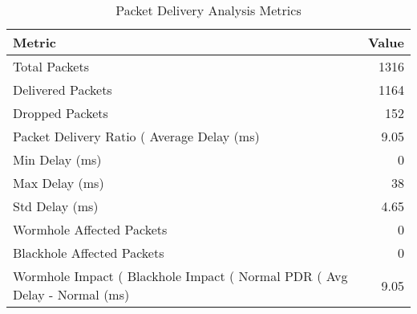 \begin{table}[htbp]
\centering
\caption{Packet Delivery Analysis Metrics}
\begin{tabular}{|l|r|}
\hline
\textbf{Metric} & \textbf{Value} \\
\hline
Total Packets & 1316 \\
Delivered Packets & 1164 \\
Dropped Packets & 152 \\
Packet Delivery Ratio (%
Average Delay (ms) & 9.05 \\
Min Delay (ms) & 0 \\
Max Delay (ms) & 38 \\
Std Delay (ms) & 4.65 \\
Wormhole Affected Packets & 0 \\
Blackhole Affected Packets & 0 \\
Wormhole Impact (%
Blackhole Impact (%
Normal PDR (%
Avg Delay - Normal (ms) & 9.05 \\
\hline
\end{tabular}
\label{tab:metrics}
\end{table}
